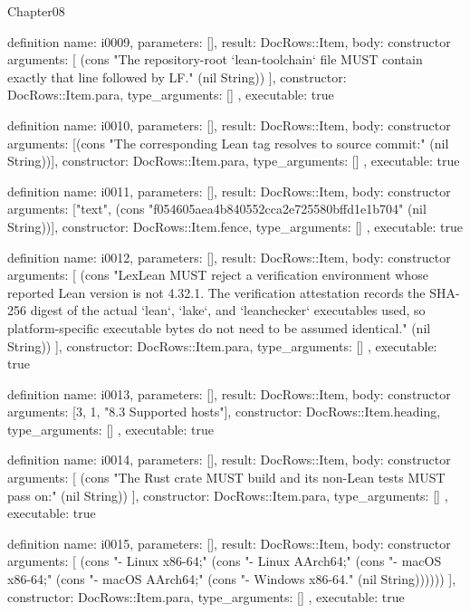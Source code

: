 \begin{lexlean}{Chapter08}
\begin{semanticmodule}
definition{
  name: i0009,
  parameters: [],
  result: DocRows::Item,
  body: constructor{
    arguments: [
      (cons "The repository-root `lean-toolchain` file MUST contain exactly that line followed by LF." (nil String))
    ],
    constructor: DocRows::Item.para,
    type_arguments: []
  },
  executable: true
}

definition{
  name: i0010,
  parameters: [],
  result: DocRows::Item,
  body: constructor{
    arguments: [(cons "The corresponding Lean tag resolves to source commit:" (nil String))],
    constructor: DocRows::Item.para,
    type_arguments: []
  },
  executable: true
}

definition{
  name: i0011,
  parameters: [],
  result: DocRows::Item,
  body: constructor{
    arguments: ["text", (cons "f054605aea4b840552cca2e725580bffd1e1b704" (nil String))],
    constructor: DocRows::Item.fence,
    type_arguments: []
  },
  executable: true
}

definition{
  name: i0012,
  parameters: [],
  result: DocRows::Item,
  body: constructor{
    arguments: [
      (cons "LexLean MUST reject a verification environment whose reported Lean version is not 4.32.1. The verification attestation records the SHA-256 digest of the actual `lean`, `lake`, and `leanchecker` executables used, so platform-specific executable bytes do not need to be assumed identical." (nil String))
    ],
    constructor: DocRows::Item.para,
    type_arguments: []
  },
  executable: true
}

definition{
  name: i0013,
  parameters: [],
  result: DocRows::Item,
  body: constructor{
    arguments: [3, 1, "8.3 Supported hosts"],
    constructor: DocRows::Item.heading,
    type_arguments: []
  },
  executable: true
}

definition{
  name: i0014,
  parameters: [],
  result: DocRows::Item,
  body: constructor{
    arguments: [
      (cons "The Rust crate MUST build and its non-Lean tests MUST pass on:" (nil String))
    ],
    constructor: DocRows::Item.para,
    type_arguments: []
  },
  executable: true
}

definition{
  name: i0015,
  parameters: [],
  result: DocRows::Item,
  body: constructor{
    arguments: [
      (cons "- Linux x86-64;" (cons "- Linux AArch64;" (cons "- macOS x86-64;" (cons "- macOS AArch64;" (cons "- Windows x86-64." (nil String))))))
    ],
    constructor: DocRows::Item.para,
    type_arguments: []
  },
  executable: true
}


\end{semanticmodule}
\end{lexlean}
